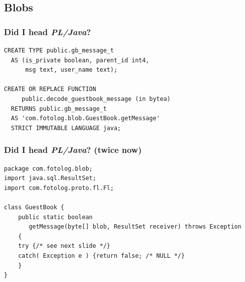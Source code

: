 \documentclass[english]{beamer}
\begin{document}
\subsection{Blobs}


\begin{frame}[fragile]
  \frametitle{Did I head \textit{PL/Java}?}

  \begin{example}
\begin{verbatim}
CREATE TYPE public.gb_message_t
  AS (is_private boolean, parent_id int4,
      msg text, user_name text);

CREATE OR REPLACE FUNCTION
     public.decode_guestbook_message (in bytea)
  RETURNS public.gb_message_t
  AS 'com.fotolog.blob.GuestBook.getMessage'
  STRICT IMMUTABLE LANGUAGE java;
\end{verbatim}
  \end{example}
\end{frame}

\begin{frame}[fragile]
  \frametitle{Did I head \textit{PL/Java}? (twice now)}

  \begin{example}
\begin{verbatim}
package com.fotolog.blob;
import java.sql.ResultSet;
import com.fotolog.proto.fl.Fl;

class GuestBook {
    public static boolean
       getMessage(byte[] blob, ResultSet receiver) throws Exception
    {
	try {/* see next slide */}
	catch( Exception e ) {return false; /* NULL */}
    }
}
\end{verbatim}
  \end{example}
\end{frame}
\end{document}
